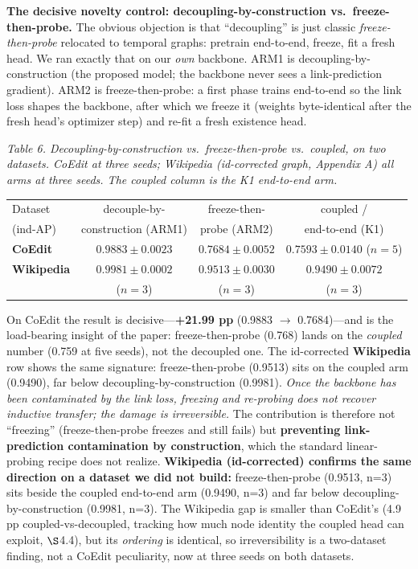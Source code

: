 \documentclass[conference]{IEEEtran}
\newcommand{\floatcap}[1]{{\footnotesize\itshape #1\par}}
\begin{document}
\textbf{The decisive novelty control: decoupling-by-construction vs.~freeze-then-probe.} The obvious objection is that ``decoupling'' is just classic \emph{freeze-then-probe} relocated to temporal graphs: pretrain end-to-end, freeze, fit a fresh head. We ran exactly that on our \emph{own} backbone. ARM1 is decoupling-by-construction (the proposed model; the backbone never sees a link-prediction gradient). ARM2 is freeze-then-probe: a first phase trains end-to-end so the link loss shapes the backbone, after which we freeze it (weights byte-identical after the fresh head's optimizer step) and re-fit a fresh existence head.

\begin{table}[t]
\centering
\floatcap{Table 6. Decoupling-by-construction vs.\ freeze-then-probe vs.\ coupled, on two datasets. CoEdit at three seeds; Wikipedia (id-corrected graph, Appendix A) all arms at three seeds. The coupled column is the K1 end-to-end arm.}
\small
\begin{tabular}{@{}lccc@{}}
\toprule
Dataset & decouple-by- & freeze-then- & coupled / \\
(ind-AP) & construction (ARM1) & probe (ARM2) & end-to-end (K1) \\
\midrule
\textbf{CoEdit} & $\mathbf{0.9883 \pm 0.0023}$ & $0.7684 \pm 0.0052$ & $0.7593 \pm 0.0140$ ($n{=}5$) \\
\textbf{Wikipedia} & $\mathbf{0.9981 \pm 0.0002}$ & $0.9513 \pm 0.0030$ & $0.9490 \pm 0.0072$ \\
 & ($n{=}3$) & ($n{=}3$) & ($n{=}3$) \\
\bottomrule
\end{tabular}
\end{table}

On CoEdit the result is decisive---\textbf{+21.99 pp} (0.9883 $\rightarrow$ 0.7684)---and is the load-bearing insight of the paper: freeze-then-probe (0.768) lands on the \emph{coupled} number (0.759 at five seeds), not the decoupled one. The id-corrected \textbf{Wikipedia} row shows the same signature: freeze-then-probe (0.9513) sits on the coupled arm (0.9490), far below decoupling-by-construction (0.9981). \emph{Once the backbone has been contaminated by the link loss, freezing and re-probing does not recover inductive transfer; the damage is irreversible.} The contribution is therefore not ``freezing'' (freeze-then-probe freezes and still fails) but \textbf{preventing link-prediction contamination by construction}, which the standard linear-probing recipe does not realize. \textbf{Wikipedia (id-corrected) confirms the same direction on a dataset we did not build:} freeze-then-probe (0.9513, n=3) sits beside the coupled end-to-end arm (0.9490, n=3) and far below decoupling-by-construction (0.9981, n=3). The Wikipedia gap is smaller than CoEdit's (4.9 pp coupled-vs-decoupled, tracking how much node identity the coupled head can exploit, $\S$4.4), but its \emph{ordering} is identical, so irreversibility is a two-dataset finding, not a CoEdit peculiarity, now at three seeds on both datasets.
\end{document}
